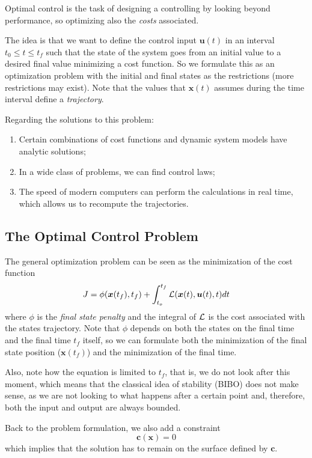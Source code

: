 Optimal control is the task of designing a controlling by looking beyond performance, so optimizing also the \emph{costs} associated.

The idea is that we want to define the control input  $\bm{u}(t)$ in an interval $t_0 \le t\le t_f$ such that the state of the system goes from an initial value to a desired final value minimizing a cost function. So we formulate this as an optimization problem with the initial and final states as the restrictions (more restrictions may exist). Note that the values that $\bm{x}(t)$ assumes during the time interval define a \emph{trajectory}.

Regarding the solutions to this problem:

\begin{enumerate}
    \item Certain combinations of cost functions and dynamic system models have analytic solutions;
    \item In a wide class of problems, we can find control laws;
    \item The speed of modern computers can perform the calculations in real time, which allows us to recompute the trajectories.
\end{enumerate}

\subsection*{The Optimal Control Problem}

The general optimization problem can be seen as the minimization of the cost function \[
J=\phi(\bm{x}(t_f),t_f) + \int_{t_o}^{t_f} \mathcal{L}(\bm{x}(t),\bm{u}(t),t)dt 
\] where $\phi$ is the \emph{final state penalty} and the integral of $\mathcal{L}$ is the cost associated with the states  trajectory. Note that $\phi$ depends on both the states on the final time and the final time $t_f$ itself, so we can formulate both the minimization of the final state position ($\bm{x}(t_f)$) and the minimization of the final time.

Also, note how the equation is limited to $t_f$, that is, we do not look after this moment, which means that the classical idea of stability (BIBO) does not make sense, as we are not looking to what happens after a certain point and, therefore, both the input and output are always bounded.

Back to the problem formulation, we also add a constraint \[
    \bm{c}(\bm{x}) = 0
\] which implies that the solution has to remain on the surface defined by $\bm{c}$.

